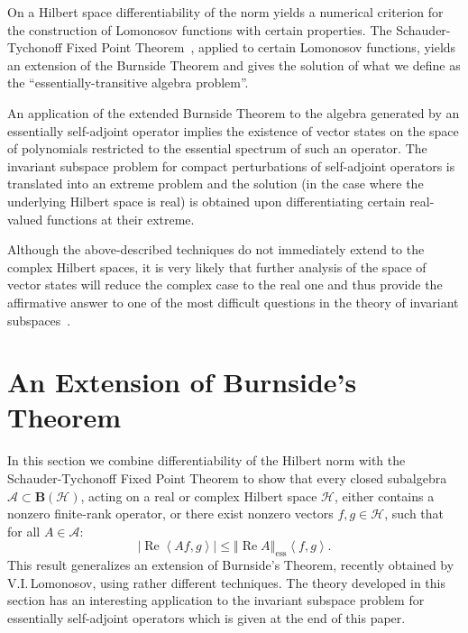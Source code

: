 \documentclass{tran-l}
\theoremstyle{definition}
\theoremstyle{remark}
\numberwithin{equation}{subsection}
\DeclareMathOperator{\RE}{Re}
\DeclareMathOperator{\ess}{ess}
\newcommand{\h}{\mathcal{H}}
\newcommand{\A}{\mathcal{A}}
\newcommand{\BH}{\mathbf{B}(\mathcal{H})}
\newcommand{\abs}[1]{\left\vert#1\right\vert}
\newcommand{\seq}[1]{\left<#1\right>}
\newcommand{\norm}[1]{\left\Vert#1\right\Vert}
\newcommand{\essnorm}[1]{\norm{#1}_{\ess}}
\begin{document}
On a Hilbert space differentiability of the norm yields a numerical criterion for the construction of Lomonosov functions with certain properties. The Schauder-Tychonoff Fixed Point Theorem~\cite[p.~456]{DS57}, applied to certain Lomonosov functions, yields an extension of the Burnside Theorem and gives the solution of what we define as the ``essentially-transitive algebra problem''.

An application of the extended Burnside Theorem to the algebra generated by an essentially self-adjoint operator implies the existence of vector states on the space of polynomials restricted to the essential spectrum of such an operator. The invariant subspace problem for compact perturbations of self-adjoint operators is translated into an extreme problem and the solution (in the case where the underlying Hilbert space is real) is obtained upon differentiating certain real-valued functions at their extreme.

Although the above-described techniques do not immediately extend to the complex Hilbert spaces, it is very likely that further analysis of the space of vector states will reduce the complex case to the real one and thus provide the affirmative answer to one of the most difficult questions in the theory of invariant subspaces~\cite{Lom92}.


\section{An Extension of Burnside's Theorem}

In this section we combine differentiability of the Hilbert norm with the Schauder-Tychonoff Fixed Point Theorem to show that every closed subalgebra $\A\subset\BH$, acting on a real or complex Hilbert space $\h$, either contains a nonzero finite-rank operator, or there exist nonzero vectors $f,g\in\h$, such that for all $A\in\A$:
\[ \abs{\RE\seq{A f,g}}\leq\essnorm{\RE A}\seq{f,g}. \]
This result generalizes an extension of Burnside's Theorem, recently obtained by V.I.\,Lomonosov, using rather different techniques. The theory developed in this section has an interesting application to the invariant subspace problem for essentially self-adjoint operators which is given at the end of this paper.

\end{document}
